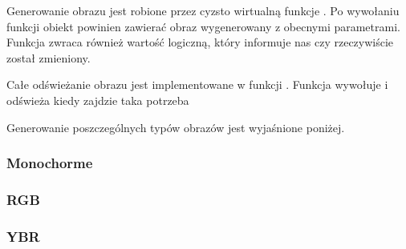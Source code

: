 Generowanie obrazu jest robione przez cyzsto wirtualną funkcje .
Po wywołaniu funkcji obiekt  powinien zawierać obraz wygenerowany z obecnymi parametrami.
Funkcja zwraca również wartość logiczną, który informuje nas czy  rzeczywiście został zmieniony.

Całe odświeżanie obrazu jest implementowane w funkcji .
Funkcja wywołuje  i odświeża  kiedy zajdzie taka potrzeba

Generowanie poszczególnych typów obrazów jest wyjaśnione poniżej.

\subsubsection{Monochorme}


\subsubsection{RGB}


\subsubsection{YBR}
